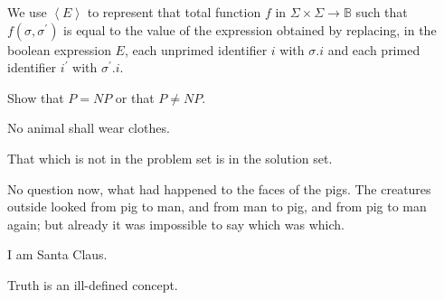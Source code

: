 \begin{notation}
We use $\left\langle E\right\rangle $ to represent that total function $f$
in $\Sigma \times \Sigma \rightarrow \mathbb{B}$ such that $f(\sigma ,\sigma
^{\prime })$ is equal to the value of the expression obtained by replacing,
in the boolean expression $E$, each unprimed identifier $i$ with $\sigma .i$
and each primed identifier $i^{\prime }$ with $\sigma ^{\prime }.i$.
\end{notation}

\begin{problem}
Show that $P=NP$ or that $P\neq NP$.
\end{problem}

\begin{proposition}
No animal shall wear clothes.
\end{proposition}

\begin{solution}
That which is not in the problem set is in the solution set.
\end{solution}

\begin{summary}
No question now, what had happened to the faces of the pigs. The creatures
outside looked from pig to man, and from man to pig, and from pig to man
again; but already it was impossible to say which was which.
\end{summary}

\begin{theorem}
\label{thm:santa}I am Santa Claus.
\end{theorem}

\begin{remark}
Truth is an ill-defined concept.
\end{remark}

